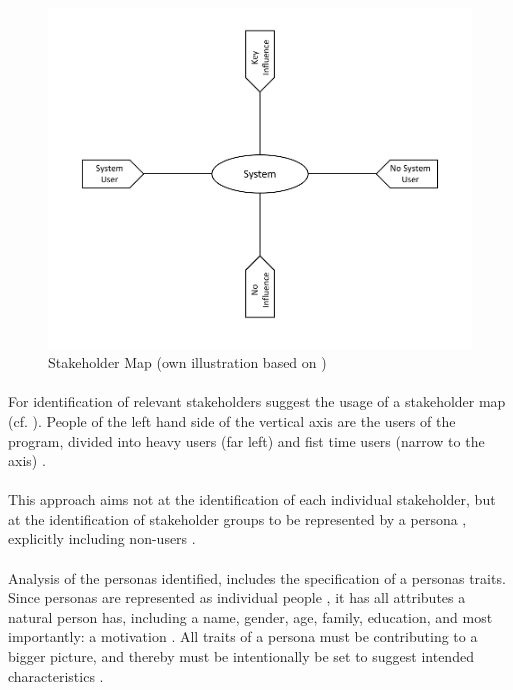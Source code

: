 \begin{figure}[H]
\centering
    \includegraphics[scale=0.7]{img/stakeholderMap.pdf}
    \caption[Stakeholder Map]{Stakeholder Map (own illustration based on \cite[38]{Robier.2016})}
    \label{fig:stakeMap}
\end{figure}

\paragraph{} For identification of relevant stakeholders \textcite[38]{Robier.2016} suggest the usage of a stakeholder map (cf. ). People of the left hand side of the vertical axis are the users of the program, divided into heavy users (far left) and fist time users (narrow to the axis) \parencite[cf.][38]{Robier.2016}.
\paragraph{} This approach aims not at the identification of each individual stakeholder, but at the identification of stakeholder groups to be represented by a persona \parencite[cf.][82]{Cooper.2007}, explicitly  including non-users \parencite[cf.][84]{Cooper.2007}.

\paragraph{} Analysis of the personas identified, includes the specification of a personas traits. Since personas are represented as individual people \parencite[cf.][81]{Cooper.2007}, it has all attributes a natural person has, including a name, gender, age, family, education, and most importantly: a motivation \parencites[cf.][]{Platt.2016}[cf.][83-84]{Cooper.2007}. All traits of a persona must be contributing to a bigger picture, and thereby must be intentionally be set to suggest intended characteristics \parencite[cf.]{Platt.2016}. 

